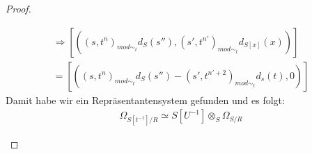 \documentclass[10pt,a4paper]{report}
\newcommand{\comment}[1]{}
\newcommand{\function}[5]{\nolinebreak{#1:#2 \longrightarrow #3 \, , \, #4 \longmapsto #5}}
\newcommand{\divR}[2]{\Omega_{#1/#2}}
\newcommand{\Tensor}[3]{#1 \otimes_{#2} #3}
\newcommand{\tensor}[3]{#1 \otimes #3}
\newcommand{\lok}[2]{#1 [#2^{-1}]}
\newcommand{\loke}[3]{(#1,#2)_{mod\sim_{#3}}}
\newcommand{\colimes}[0]{\lim\limits_{ \longrightarrow }}
\begin{document}
\begin{proof}
\begin{itemize}
\begin{gather*}
  \Rightarrow [(\loke{s}{t^n}{t}d_{S}(s'') , \loke{s'}{t^{n'}}{t}d_{S[x]}(x) )] \\
   = [( \loke{s}{t^n}{t}d_{S}(s'') - \loke{s'}{t^{n' +2}}{t} d_{s}(t), 0 )]
\end{gather*}
Damit habe wir ein Repräsentantensystem \comment{für $\Tensor{\lok{S}{t}}{S}{\divR{S}{R}} \oplus (\lok{S}{t}) d_{S[x]}x) / (td_{S[x]}(x) + xd_{S[x]}(t))$} gefunden und es folgt:
\begin{gather*} 
\divR{\lok{S}{t}}{R} \comment{\simeq \Tensor{S[x]/(tx -1)}{S}{\divR{S}{R}}} \simeq \Tensor{\lok{S}{U}}{S}{\divR{S}{R}}
\end{gather*}
\end{itemize}
\comment{
Zeige nun den Allgemeinen Fall $\divR{\lok{S}{U}}{R} \simeq \Tensor{\lok{S}{U}}{S}{\divR{S}{R}}$:
\begin{itemize}
\item[]
Wähle wie schon erwähnt $\mathcal{B} = \lbrace \lok{S}{t} \vert t \in U \rbrace$ wie in \cref{Lokalisierung von Algebren als Kolimes}, sodass $\colimes \mathcal{B} = \lok{S}{U}$ gilt.\\
Mit THEOREM16.8 \comment{\label{THEOREM16.8}} folgt somit:
\begin{gather*}
\divR{\lok{S}{U}}{T} = \colimes \mathcal{F}, für:\\
\function{\mathcal{F}}{\mathcal{B}}{(\lok{S}{U}-Module)}{\lok{S}{t}}{\tensor{\lok{S}{U}}{\lok{S}{t}}{\divR{\lok{S}{t}}{R}}}
(\functiofront{\varphi}{S}{S'}) \longmapsto (\fuctionfront{\tensor{1}{S}{D\varphi}}{}{})
\end{gather*}
\end{itemize}
}
\end{proof}
\end{document}
